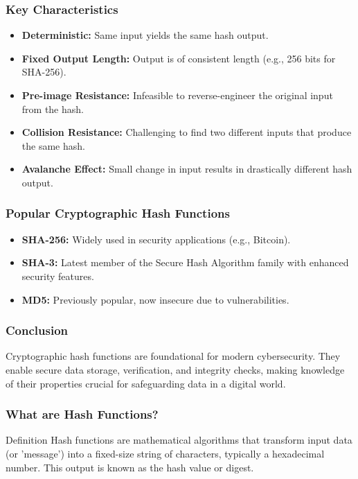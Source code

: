\documentclass{beamer}
\begin{document}
\begin{frame}[fragile]
    \frametitle{Key Characteristics}
    \begin{itemize}
        \item \textbf{Deterministic:} Same input yields the same hash output.
        \item \textbf{Fixed Output Length:} Output is of consistent length (e.g., 256 bits for SHA-256).
        \item \textbf{Pre-image Resistance:} Infeasible to reverse-engineer the original input from the hash.
        \item \textbf{Collision Resistance:} Challenging to find two different inputs that produce the same hash.
        \item \textbf{Avalanche Effect:} Small change in input results in drastically different hash output.
    \end{itemize}
\end{frame}

\begin{frame}[fragile]
    \frametitle{Popular Cryptographic Hash Functions}
    \begin{itemize}
        \item \textbf{SHA-256:} Widely used in security applications (e.g., Bitcoin).
        \item \textbf{SHA-3:} Latest member of the Secure Hash Algorithm family with enhanced security features.
        \item \textbf{MD5:} Previously popular, now insecure due to vulnerabilities.
    \end{itemize}
\end{frame}

\begin{frame}[fragile]
    \frametitle{Conclusion}
    Cryptographic hash functions are foundational for modern cybersecurity. They enable secure data storage, verification, and integrity checks, making knowledge of their properties crucial for safeguarding data in a digital world.
\end{frame}

\begin{frame}[fragile]
    \frametitle{What are Hash Functions?}
    \begin{block}{Definition}
        Hash functions are mathematical algorithms that transform input data (or 'message') into a fixed-size string of characters, typically a hexadecimal number. This output is known as the hash value or digest.
    \end{block}
\end{frame}
\end{document}

